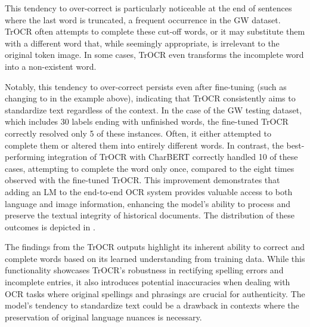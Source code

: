 This tendency to over-correct is particularly noticeable at the end of sentences where the last word is truncated, a frequent occurrence in the GW dataset. TrOCR often attempts to complete these cut-off words, or it may substitute them with a different word that, while seemingly appropriate, is irrelevant to the original token image. In some cases, TrOCR even transforms the incomplete word into a non-existent word.

Notably, this tendency to over-correct persists even after fine-tuning (such as changing  to  in the example above), indicating that TrOCR consistently aims to standardize text regardless of the context. In the case of the GW testing dataset, which includes 30 labels ending with unfinished words, the fine-tuned TrOCR correctly resolved only 5 of these instances. Often, it either attempted to complete them or altered them into entirely different words. In contrast, the best-performing integration of TrOCR with CharBERT correctly handled 10 of these cases, attempting to complete the word only once, compared to the eight times observed with the fine-tuned TrOCR. This improvement demonstrates that adding an LM to the end-to-end OCR system provides valuable access to both language and image information, enhancing the model's ability to process and preserve the textual integrity of historical documents. The distribution of these outcomes is depicted in .


The findings from the TrOCR outputs highlight its inherent ability to correct and complete words based on its learned understanding from training data. While this functionality showcases TrOCR's robustness in rectifying spelling errors and incomplete entries, it also introduces potential inaccuracies when dealing with OCR tasks where original spellings and phrasings are crucial for authenticity. The model's tendency to standardize text could be a drawback in contexts where the preservation of original language nuances is necessary.

